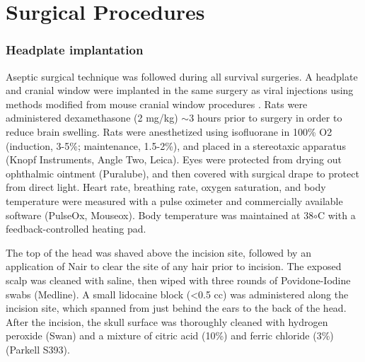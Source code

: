 \section{Surgical Procedures}
\subsubsection{Headplate implantation}
Aseptic surgical technique was followed during all survival surgeries. A headplate and cranial window were implanted in the same surgery as viral injections using methods modified from mouse cranial window procedures \cite{Goldey2014}. Rats were administered dexamethasone (2 mg/kg) $\sim$3 hours prior to surgery in order to reduce brain swelling. Rats were anesthetized using isofluorane in 100\% O2 (induction, 3-5\%; maintenance, 1.5-2\%), and placed in a stereotaxic apparatus (Knopf Instruments, Angle Two, Leica). Eyes were protected from drying out ophthalmic ointment (Puralube), and then covered with surgical drape to protect from direct light. Heart rate, breathing rate, oxygen saturation, and body temperature were measured with a pulse oximeter and commercially available software (PulseOx, Mouseox). Body temperature was maintained at 38$\circ$C with a feedback-controlled heating pad. 

The top of the head was shaved above the incision site, followed by an application of Nair to clear the site of any hair prior to incision. The exposed scalp was cleaned with saline, then wiped with three rounds of Povidone-Iodine swabs (Medline). A small lidocaine block (<0.5 cc) was administered along the incision site, which spanned from just behind the ears to the back of the head. After the incision, the skull surface was thoroughly cleaned with hydrogen peroxide (Swan) and a mixture of citric acid (10\%) and ferric chloride (3\%) (Parkell S393). 


